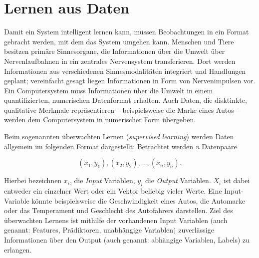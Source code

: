 \section{Lernen aus Daten}

Damit ein System intelligent lernen kann, müssen Beobachtungen in ein Format gebracht
werden, mit dem das System umgehen kann. Menschen und Tiere besitzen primäre
Sinnesorgane, die Informationen über die Umwelt über Nervenlaufbahnen in ein
zentrales Nervensystem transferieren. Dort werden Informationen aus verschiedenen
Sinnesmodalitäten integriert und Handlungen geplant; vereinfacht gesagt liegen
Informationen in Form von Nervenimpulsen vor. Ein Computersystem muss Informationen
über die Umwelt in einem quantifizierten, numerischen Datenformat erhalten. Auch
Daten, die disktinkte, qualitative Merkmale repräsentieren -- beispielsweise die
Marke eines Autos -- werden dem Computersystem in numerischer Form übergeben.

Beim sogenannten überwachten Lernen (\emph{supervised learning}) werden Daten
allgemein im folgenden Format dargestellt: Betrachtet werden \emph{n} Datenpaare


\begin{equation*}
    (x_{1}, y_{1}), (x_{2},y_{2}), \ldots, (x_{n}, y_{n}).
\end{equation*}

Hierbei bezeichnen $x_{i}$, die \emph{Input} Variablen, $y_{i}$
die \emph{Output} Variablen. $X_{i}$ ist dabei entweder ein einzelner Wert
oder ein Vektor beliebig vieler Werte. Eine Input-Variable könnte beispielsweise die
Geschwindigkeit eines Autos, die Automarke oder das Temperament und Geschlecht des
Autofahrers darstellen. Ziel des überwachten Lernens ist mithilfe der vorhandenen
Input Variablen $($auch genannt: Features, Prädiktoren, unabhängige Variablen$)$
zuverlässige Informationen über den Output (auch genannt: abhängige Variablen,
Labels) zu erlangen.

